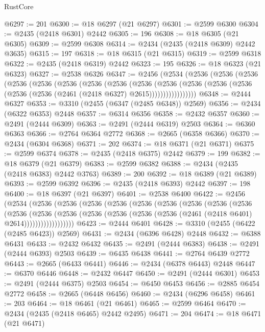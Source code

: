 \begin{lexlean}{RustCore}
\begin{coremodule}
@6297 := 201
@6300 := @18 @6297 (@21 @6297)
@6301 := @2599 @6300
@6304 := @2435 (@2418 @6301) @2442
@6305 := 196
@6308 := @18 @6305 (@21 @6305)
@6309 := @2599 @6308
@6314 := @2434 (@2435 (@2418 @6309) @2442 @3635)
@6315 := 197
@6318 := @18 @6315 (@21 @6315)
@6319 := @2599 @6318
@6322 := @2435 (@2418 @6319) @2442
@6323 := 195
@6326 := @18 @6323 (@21 @6323)
@6327 := @2538 @6326
@6347 := @2456
    (@2534
      (@2536
        (@2536
          (@2536
            (@2536
              (@2536
                (@2536
                  (@2536
                    (@2536
                      (@2536
                        (@2536
                          (@2536
                            (@2536 (@2536 (@2536 (@2536 (@2461 (@2418 @6327) @2615)))))))))))))))))
@6348 := @2444 @6327
@6353 := @3310 (@2455 (@6347 (@2485 @6348)) @2569)
@6356 := @2434 (@6322 @6353) @2448
@6357 := @6314 @6356
@6358 := @2432 @6357
@6360 := @2491 (@2444 @6309)
@6363 := @2491 (@2444 @6319) @2503
@6364 := @6360 @6363
@6366 := @2764 @6364 @2772
@6368 := @2665 (@6358 @6366)
@6370 := @2434 (@6304 @6368)
@6371 := 202
@6374 := @18 @6371 (@21 @6371)
@6375 := @2599 @6374
@6378 := @2435 (@2418 @6375) @2442
@6379 := 199
@6382 := @18 @6379 (@21 @6379)
@6383 := @2599 @6382
@6388 := @2434 (@2435 (@2418 @6383) @2442 @3763)
@6389 := 200
@6392 := @18 @6389 (@21 @6389)
@6393 := @2599 @6392
@6396 := @2435 (@2418 @6393) @2442
@6397 := 198
@6400 := @18 @6397 (@21 @6397)
@6401 := @2538 @6400
@6422 := @2456
    (@2534
      (@2536
        (@2536
          (@2536
            (@2536
              (@2536
                (@2536
                  (@2536
                    (@2536
                      (@2536
                        (@2536
                          (@2536
                            (@2536
                              (@2536
                                (@2536 (@2536 (@2536 (@2461 (@2418 @6401) @2614))))))))))))))))))
@6423 := @2444 @6401
@6428 := @3310 (@2455 (@6422 (@2485 @6423)) @2569)
@6431 := @2434 (@6396 @6428) @2448
@6432 := @6388 @6431
@6433 := @2432 @6432
@6435 := @2491 (@2444 @6383)
@6438 := @2491 (@2444 @6393) @2503
@6439 := @6435 @6438
@6441 := @2764 @6439 @2772
@6443 := @2665 (@6433 @6441)
@6446 := @2434 (@6378 @6443) @2448
@6447 := @6370 @6446
@6448 := @2432 @6447
@6450 := @2491 (@2444 @6301)
@6453 := @2491 (@2444 @6375) @2503
@6454 := @6450 @6453
@6456 := @2885 @6454 @2772
@6458 := @2665 (@6448 @6456)
@6460 := @2434 (@6296 @6458)
@6461 := 203
@6464 := @18 @6461 (@21 @6461)
@6465 := @2599 @6464
@6470 := @2434 (@2435 (@2418 @6465) @2442 @2495)
@6471 := 204
@6474 := @18 @6471 (@21 @6471)

\end{coremodule}
\end{lexlean}

